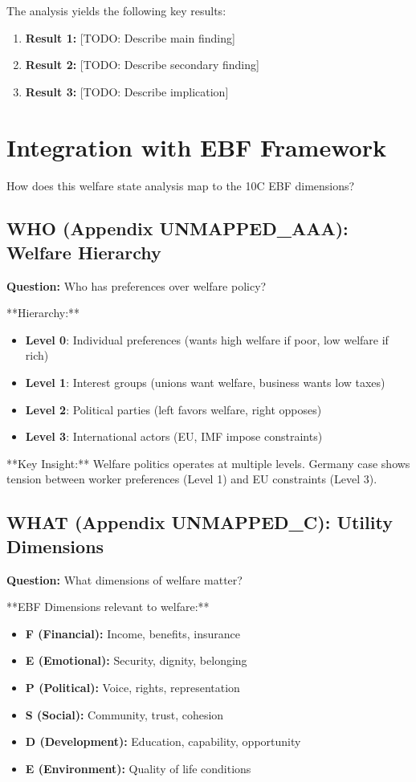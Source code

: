 The analysis yields the following key results:

\begin{enumerate}
    \item \textbf{Result 1:} [TODO: Describe main finding]
    \item \textbf{Result 2:} [TODO: Describe secondary finding]
    \item \textbf{Result 3:} [TODO: Describe implication]
\end{enumerate}

\section{Integration with EBF Framework}
\label{sec:ebf-integration}

How does this welfare state analysis map to the 10C EBF dimensions?

\subsection{WHO (Appendix UNMAPPED_AAA): Welfare Hierarchy}

\textbf{Question:} Who has preferences over welfare policy?

**Hierarchy:**
\begin{itemize}
\item \textbf{Level 0}: Individual preferences (wants high welfare if poor, low welfare if rich)
\item \textbf{Level 1}: Interest groups (unions want welfare, business wants low taxes)
\item \textbf{Level 2}: Political parties (left favors welfare, right opposes)
\item \textbf{Level 3}: International actors (EU, IMF impose constraints)
\end{itemize}

**Key Insight:** Welfare politics operates at multiple levels. Germany case shows tension between worker preferences (Level 1) and EU constraints (Level 3).

\subsection{WHAT (Appendix UNMAPPED_C): Utility Dimensions}

\textbf{Question:} What dimensions of welfare matter?

**EBF Dimensions relevant to welfare:**
\begin{itemize}
\item \textbf{F (Financial):} Income, benefits, insurance
\item \textbf{E (Emotional):} Security, dignity, belonging
\item \textbf{P (Political):} Voice, rights, representation
\item \textbf{S (Social):} Community, trust, cohesion
\item \textbf{D (Development):} Education, capability, opportunity
\item \textbf{E (Environment):} Quality of life conditions
\end{itemize}

